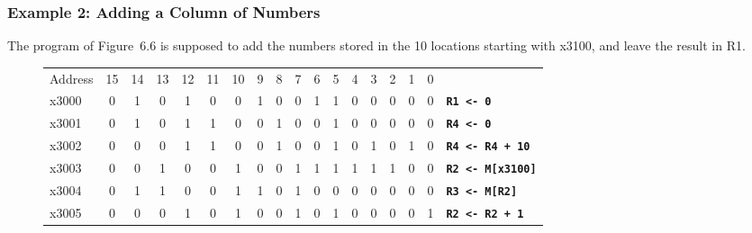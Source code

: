 \documentclass{patt}
\begin{document}
\subsubsection{Example 2: Adding a Column of Numbers}
The program of Figure~6.6 is supposed to add the numbers stored
in the 10 locations starting with x3100, and leave the result
in R1.  

\FloatBarrier
\setcounter{figure}{5}
\begin{figure}[p]
\vspace{-12pt}
\noindent\small
\begin{minipage}{36pc}
\begin{center}
\renewcommand{\tabcolsep}{5pt}%
\begin{tabular}{@{}l c c c c c c c c c c c c c c c c l }
Address & 15 & 14 & 13 & 12 & 11 & 10 & 9 & 8 & 7 & 6 & 5 & 4 & 3  & 2 & 1 & 0 \\
\cline{2-17}
x3000 & \multicolumn{1}{|c}{0} & 1 & 0 & \multicolumn{1}{c|}{1} & 0 & 0 & \multicolumn{1}{c|}{1} & 0 & 0 & \multicolumn{1}{c|}{1} & \multicolumn{1}{c|}{1} & 0 & 0 & 0 & 0 & \multicolumn{1}{c|}{0} & \multicolumn{1}{l}{\tt\bfseries R1 <- 0} \\
\cline{2-17}
x3001 & \multicolumn{1}{|c}{0} & 1 & 0 & \multicolumn{1}{c|}{1} & 1 & 0 & \multicolumn{1}{c|}{0} & 1 & 0 & \multicolumn{1}{c|}{0} & \multicolumn{1}{c|}{1} & 0 & 0 & 0 & 0 & \multicolumn{1}{c|}{0} & \multicolumn{1}{l}{\tt\bfseries R4 <- 0} \\
\cline{2-17}
x3002 & \multicolumn{1}{|c}{0} & 0 & 0 & \multicolumn{1}{c|}{1} & 1 & 0 & \multicolumn{1}{c|}{0} & 1 & 0 & \multicolumn{1}{c|}{0} & \multicolumn{1}{c|}{1} & 0 & 1 & 0 & 1 & \multicolumn{1}{c|}{0} & \multicolumn{1}{l}{\tt\bfseries R4 <- R4 + 10} \\
\cline{2-17}
x3003 & \multicolumn{1}{|c}{0} & 0 & 1 & \multicolumn{1}{c|}{0} & 0 & 1 & \multicolumn{1}{c|}{0} & 0 & 1 & 1 & 1 & 1 & 1 & 1 & 0 & \multicolumn{1}{c|}{0} & \multicolumn{1}{l}{\tt\bfseries R2 <- M[x3100]} \\
\cline{2-17}
x3004 & \multicolumn{1}{|c}{0} & 1 & 1 & \multicolumn{1}{c|}{0} & 0 & 1 & \multicolumn{1}{c|}{1} & 0 & 1 & \multicolumn{1}{c|}{0} &  0  & 0 & 0 & 0 & 0 & \multicolumn{1}{c|}{0} & \multicolumn{1}{l}{\tt\bfseries R3 <- M[R2]} \\
\cline{2-17}
x3005 & \multicolumn{1}{|c}{0} & 0 & 0 & \multicolumn{1}{c|}{1} & 0 & 1 & \multicolumn{1}{c|}{0} & 0 & 1 & \multicolumn{1}{c|}{0} & \multicolumn{1}{c|}{1} & 0 & 0 & 0 & 0 & \multicolumn{1}{c|}{1} & \multicolumn{1}{l}{\tt\bfseries R2 <- R2 + 1} \\

\end{tabular}
\end{center}
\end{minipage}
\end{figure}
\end{document}
